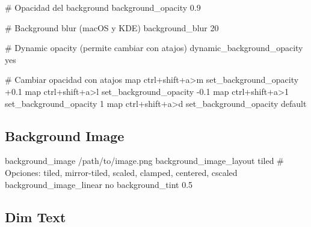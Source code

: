 \documentclass[
  doc,
  floatsintext,
  longtable,
  a4paper,
  nolmodern,
  notxfonts,
  notimes,
  12pt,
  colorlinks=true,linkcolor=blue,citecolor=blue,urlcolor=blue]{apa7}
\newenvironment{Shaded}{\begin{snugshade}}{\end{snugshade}}
\newcommand{\CommentTok}[1]{\textcolor[rgb]{0.37,0.37,0.37}{#1}}
\newcommand{\DataTypeTok}[1]{\textcolor[rgb]{0.68,0.00,0.00}{#1}}
\newcommand{\ErrorTok}[1]{\textcolor[rgb]{0.68,0.00,0.00}{#1}}
\begin{document}
\begin{Shaded}
\begin{Highlighting}[]
\CommentTok{\# Opacidad del background}
\DataTypeTok{background\_opacity} \DataTypeTok{0.9}

\CommentTok{\# Background blur (macOS y KDE)}
\DataTypeTok{background\_blur} \DataTypeTok{20}

\CommentTok{\# Dynamic opacity (permite cambiar con atajos)}
\DataTypeTok{dynamic\_background\_opacity} \DataTypeTok{yes}

\CommentTok{\# Cambiar opacidad con atajos}
\DataTypeTok{map} \DataTypeTok{ctrl}\ErrorTok{+}\DataTypeTok{shift}\ErrorTok{+}\DataTypeTok{a}\ErrorTok{\textgreater{}}\DataTypeTok{m} \DataTypeTok{set\_background\_opacity} \ErrorTok{+}\DataTypeTok{0.1}
\DataTypeTok{map} \DataTypeTok{ctrl}\ErrorTok{+}\DataTypeTok{shift}\ErrorTok{+}\DataTypeTok{a}\ErrorTok{\textgreater{}}\DataTypeTok{l} \DataTypeTok{set\_background\_opacity} \DataTypeTok{{-}0.1}
\DataTypeTok{map} \DataTypeTok{ctrl}\ErrorTok{+}\DataTypeTok{shift}\ErrorTok{+}\DataTypeTok{a}\ErrorTok{\textgreater{}}\DataTypeTok{1} \DataTypeTok{set\_background\_opacity} \DataTypeTok{1}
\DataTypeTok{map} \DataTypeTok{ctrl}\ErrorTok{+}\DataTypeTok{shift}\ErrorTok{+}\DataTypeTok{a}\ErrorTok{\textgreater{}}\DataTypeTok{d} \DataTypeTok{set\_background\_opacity} \DataTypeTok{default}
\end{Highlighting}
\end{Shaded}

\subsection{Background Image}\label{background-image}

\begin{Shaded}
\begin{Highlighting}[]
\DataTypeTok{background\_image} \ErrorTok{/}\DataTypeTok{path}\ErrorTok{/}\DataTypeTok{to}\ErrorTok{/}\DataTypeTok{image.png}
\DataTypeTok{background\_image\_layout} \DataTypeTok{tiled}
\CommentTok{\# Opciones: tiled, mirror{-}tiled, scaled, clamped, centered, cscaled}
\DataTypeTok{background\_image\_linear} \DataTypeTok{no}
\DataTypeTok{background\_tint} \DataTypeTok{0.5}
\end{Highlighting}
\end{Shaded}

\subsection{Dim Text}\label{dim-text}
\end{document}
